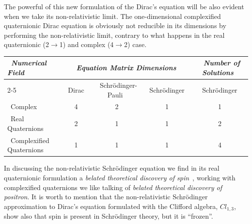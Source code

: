 The powerful of this new formulation of the Dirac's equation will be also 
evident
when we take its non-relativistic limit. The one-dimensional complexified
quaternionic Dirac equation is obviously not reducible in its dimensions by
performing the non-relativistic limit, contrary to what happens in the real 
quaternionic (2$\rightarrow$1) and complex (4$\rightarrow$2) case. 
\begin{center}
\begin{tabular}{|l|c|c|c|c|} \hline \hline
~{\em Numerical Field} & 
\multicolumn{3}{c|}{\em Equation Matrix Dimensions} & 
~{\em Number of Solutions}~\\ \cline{2-5}
         & ~Dirac~ & ~Schr\"odinger-Pauli~ & ~Schr\"odinger~ & 
~Schr\"odinger~\\ \hline \hline
~Complex  &  4    &          2          &       1       &     1     \\ \hline 
~Real Quaternions    
         &  2    &          1          &       1       &     2     \\ \hline 
~Complexified Quaternions
         &  1    &          1          &       1       &     4     \\ \hline 
\hline
\end{tabular}
\end{center}
In discussing the non-relativistic Schr\"odinger equation we find in 
its real quaternionic formulation a 
{\em belated theoretical discovery of spin}~\cite{PRD}, 
working with complexified quaternions we like talking of  
{\em belated theoretical discovery of positron}. It is worth to mention that 
the non-relativistic Schr\"odinger approximation to Dirac's equation formulated
with the Clifford algebra, $Cl_{1,3}$, show also that spin is present in
Schr\"odinger theory, but it is ``frozen''.

